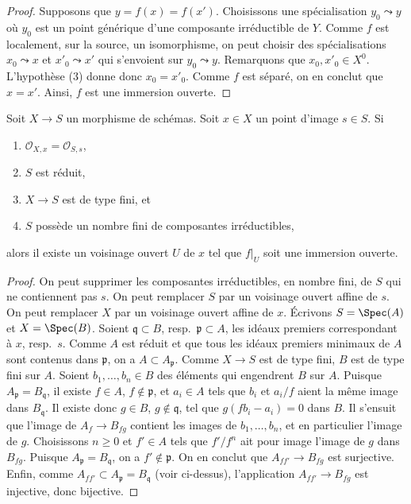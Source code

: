 \begin{proof}
Supposons que $y = f(x) = f(x')$. Choisissons une spécialisation $y_0 \leadsto y$
où $y_0$ est un point générique d'une composante irréductible de $Y$.
Comme $f$ est localement, sur la source, un isomorphisme, on peut choisir des spécialisations
$x_0 \leadsto x$ et $x'_0 \leadsto x'$ qui s'envoient sur $y_0 \leadsto y$.
Remarquons que $x_0, x'_0 \in X^0$. L'hypothèse (3) donne donc $x_0 = x'_0$.
Comme $f$ est séparé, on en conclut que $x = x'$. Ainsi, $f$ est une immersion ouverte.
\end{proof}

\begin{lemma}
\label{lemma-local-isomorphism}
Soit $X \to S$ un morphisme de schémas. Soit $x \in X$ un point
d'image $s \in S$. Si
\begin{enumerate}
\item $\mathcal{O}_{X, x} = \mathcal{O}_{S, s}$,
\item $S$ est réduit,
\item $X \to S$ est de type fini, et
\item $S$ possède un nombre fini de composantes irréductibles,
\end{enumerate}
alors il existe un voisinage ouvert $U$
de $x$ tel que $f|_U$ soit une immersion ouverte.
\end{lemma}

\begin{proof}
On peut supprimer les composantes irréductibles, en nombre fini, de $S$
qui ne contiennent pas $s$. On peut remplacer $S$ par un voisinage ouvert affine
de $s$. On peut remplacer $X$ par un voisinage ouvert affine
de $x$. Écrivons $S = \Spec(A)$ et $X = \Spec(B)$. Soient $\mathfrak q \subset B$,
resp.\ $\mathfrak p \subset A$, les idéaux premiers correspondant à $x$,
resp.\ $s$. Comme $A$ est réduit et que tous les idéaux premiers minimaux de
$A$ sont contenus dans $\mathfrak p$, on a $A \subset A_\mathfrak p$.
Comme $X \to S$ est de type fini, $B$ est de type fini sur $A$.
Soient $b_1, \ldots, b_n \in B$ des éléments qui engendrent $B$ sur $A$.
Puisque $A_\mathfrak p = B_\mathfrak q$, il existe
$f \in A$, $f \not \in \mathfrak p$,
et $a_i \in A$ tels que $b_i$ et $a_i/f$ aient la même image
dans $B_\mathfrak q$. Il existe donc $g \in B$, $g \not \in \mathfrak q$,
tel que $g(fb_i - a_i) = 0$ dans $B$. Il s'ensuit que l'image de
$A_f \to B_{fg}$ contient les images de $b_1, \ldots, b_n$, et
en particulier l'image de $g$.
Choisissons $n \geq 0$ et $f' \in A$ tels que $f'/f^n$ ait
pour image l'image de $g$ dans $B_{fg}$. Puisque $A_\mathfrak p = B_\mathfrak q$,
on a $f' \not \in \mathfrak p$.
On en conclut que $A_{ff'} \to B_{fg}$ est surjective.
Enfin, comme $A_{ff'} \subset A_\mathfrak p = B_\mathfrak q$ (voir ci-dessus),
l'application $A_{ff'} \to B_{fg}$ est injective, donc bijective.
\end{proof}

